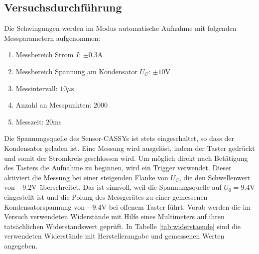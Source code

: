 \documentclass[a4paper, 12pt]{scrartcl}
\begin{document}
\subsection{Versuchsdurchführung}

Die Schwingungen werden im Modus \glqq automatische Aufnahme\grqq{} mit folgenden Messparametern aufgenommen:
\begin{enumerate}[-]
\item Messbereich Strom $I$: $\pm 0.3$A
\item Messbereich Spannung am Kondensator $U_C$: $\pm 10$V
\item Messintervall: $10\mu\text{s}$
\item Anzahl an Messpunkten: $2000$
\item Messzeit: $20$ms
\end{enumerate}
Die Spannungsquelle des Sensor-CASSYs ist stets eingeschaltet, so dass der Kondensator geladen ist. Eine Messung wird ausgelöst, indem der Taster gedrückt und somit der Stromkreis geschlossen wird. Um möglich direkt nach Betätigung des Tasters die Aufnahme zu beginnen, wird ein Trigger verwendet. Dieser aktiviert die Messung bei einer steigenden Flanke von $U_C$, die den Schwellenwert von $-9.2$V überschreitet. Das ist sinnvoll, weil die Spannungsquelle auf $U_0 = 9.4$V eingestellt ist und die Polung des Messgerätes zu einer gemessenen Kondensatorspannung von $-9.4$V bei offenem Taster führt. 
Vorab werden die im Versuch verwendeten Widerstände mit Hilfe eines Multimeters auf ihren tatsächlichen Widerstandswert geprüft. In Tabelle \ref{tab:widerstaende} sind die verwendeten Widerstände mit Herstellerangabe und gemessenen Werten angegeben.
\end{document}
